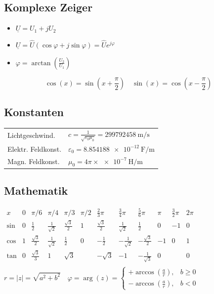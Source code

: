 \subsection{Komplexe Zeiger}
\begin{itemize}
    \item $\underline U = U_1 + jU_2$
    \item $\underline U = \hat U (\cos\varphi + j\sin\varphi)=\hat U e^{j\varphi}$
    \item $\varphi = \arctan(\frac{U_2}{U_1})$
\end{itemize}

\begin{equation*}
    \cos(x) = \sin(x + \frac{\pi}{2}) \quad \sin(x) = \cos(x - \frac{\pi}{2})
\end{equation*}

\subsection{Konstanten}
\begin{tabular*}{\columnwidth}{@{\extracolsep\fill}ll@{}} \trule
    Lichtgeschwind. & $c = \frac{1}{\sqrt{\varepsilon_0 \mu_0}} = \SI{299 792 458}{\meter\per\second}$\\
    Elektr. Feldkonst. & $\varepsilon_0 = \SI{8.854 188e-12}{\farad\per\meter}$\\
    Magn. Feldkonst. & $\mu_0 = 4\pi \times \SI{e-7}{\henry\per\meter}$\\
\end{tabular*}

\subsection{Mathematik}
\hspace{-20pt}
\scalebox{0.77}
{
    $\begin{array}{c|c|c|c|c|c|c|c|c|c|c|c}
            x    & 0 & \pi / 6            & \pi / 4            & \pi / 3           & \pi / 2 & \frac{2}{3}\pi    & \frac{3}{4}\pi     & \frac{5}{6}\pi      & \pi & \frac{3}{2}\pi & 2 \pi \\ \hline
            \sin & 0 & \frac{1}{2}        & \frac{1}{\sqrt{2}} & \frac{\sqrt 3}{2} & 1       & \frac{\sqrt 3}{2} & \frac{1}{\sqrt{2}} & \frac{1}{2}         & 0   & -1             & 0     \\
            \cos & 1 & \frac{\sqrt 3}{2}  & \frac{1}{\sqrt 2}  & \frac{1}{2}       & 0       & -\frac{1}{2}      & -\frac{1}{\sqrt 2} & -\frac{\sqrt 3}{2}  & -1  & 0              & 1     \\
            \tan & 0 & \frac{\sqrt{3}}{3} & 1                  & \sqrt{3}          &         & -\sqrt{3}         & -1                 & -\frac{1}{\sqrt{3}} & 0   &                & 0     \\
        \end{array}$
}
$r=|z|=\sqrt{a^2+b^2}\quad\varphi=\arg(z)=\begin{cases}+\arccos \left( \frac{a}{r}\right),  & b\ge0   \\  -\arccos \left( \frac{a}{r}\right), & b<0\end{cases}$
